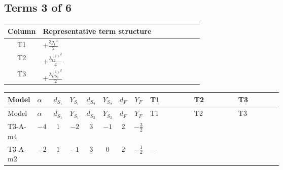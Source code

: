 \documentclass[8pt]{article}
\begin{document}
\begin{landscape}
\subsection*{Terms 3 of 6}
\begin{center}
\begin{tabular}{@{}c >{\raggedright\arraybackslash}p{0.82\linewidth}@{}}
\toprule
Column & Representative term structure \\
\midrule
T1 & \(\displaystyle +\frac{3 {g_1}^4}{2}\) \\
\midrule
T2 & \(\displaystyle +\frac{{\lambda_{12}^{(1)}}^2}{4}\) \\
\midrule
T3 & \(\displaystyle +\frac{{\lambda_{HS_2}^{(1)}}^2}{2}\) \\
\midrule
\bottomrule
\end{tabular}
\end{center}
\smallskip
\tiny
\begin{longtable}{@{}llcccccc >{\raggedright\arraybackslash}p{0.21\linewidth} >{\raggedright\arraybackslash}p{0.21\linewidth} >{\raggedright\arraybackslash}p{0.21\linewidth}@{}}
\toprule
Model & $\alpha$ & $d_{S_1}$ & $Y_{S_1}$ & $d_{S_2}$ & $Y_{S_2}$ & $d_F$ & $Y_F$ & T1 & T2 & T3 \\
\midrule
\endfirsthead
\toprule
Model & $\alpha$ & $d_{S_1}$ & $Y_{S_1}$ & $d_{S_2}$ & $Y_{S_2}$ & $d_F$ & $Y_F$ & T1 & T2 & T3 \\
\midrule
\endhead
T3-A-m4 & $-4$ & $1$ & $-2$ & $3$ & $-1$ & $2$ & $-\frac{3}{2}$ & \scriptsize\adjustbox{max width=\linewidth}{$\begin{gathered} +\frac{3 {g_1}^4}{2}\end{gathered}$} & \scriptsize\adjustbox{max width=\linewidth}{$\begin{gathered} +\frac{{\lambda_{12}^{(1)}}^2}{4}\end{gathered}$} & \scriptsize\adjustbox{max width=\linewidth}{$\begin{gathered} +\frac{{\lambda_{HS_2}^{(1)}}^2}{2}\end{gathered}$} \\
\midrule
T3-A-m2 & $-2$ & $1$ & $-1$ & $3$ & $0$ & $2$ & $-\frac{1}{2}$ & --- & \scriptsize\adjustbox{max width=\linewidth}{$\begin{gathered} +\frac{{\lambda_{12}^{(1)}}^2}{4}\end{gathered}$} & \scriptsize\adjustbox{max width=\linewidth}{$\begin{gathered} +\frac{{\lambda_{HS_2}^{(1)}}^2}{2}\end{gathered}$} \\

\end{longtable}
\end{landscape}
\end{document}
